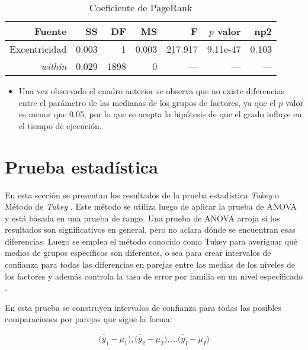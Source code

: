 \documentclass{article}
\begin{document}
\begin{table}[H]
\caption{{\small Coeficiente de PageRank}}
\begin{center}		
	\centering
		\begin{tabular}{rrrrrrr}		
			\hline
			\textbf{Fuente} & \textbf{SS} & \textbf{DF} & \textbf{MS}& \textbf{F}& \textbf{$p$ valor} & \textbf{np2}\\
			
			\hline
			 Excentricidad & 0.003  & 1 & 0.003  & 217.917 & 9.11e-47 & 0.103 \\
			 \textit{within}    & 0.029 & 1898 & 0  & --- & --- & --- \\			 			 
			\hline
		\end{tabular}
		\label{cual}
	\label{tab:una-tablita}
\end{center}	
\end{table}

\begin{itemize}
  \item Una vez observado el cuadro anterior se observa que no existe diferencias entre el parámetro de las medianas de los grupos de factores, ya que el $p$ valor es menor que 0.05, por lo que se acepta la hipótesis de que el grado influye en el tiempo de ejecución.    
\end{itemize}

\section{Prueba estadística}

En esta sección se presentan los resultados de la prueba estadística \textit{Tukey} o Método de \textit{Tukey} \cite{tukey}. Este método se utiliza luego de aplicar la prueba de ANOVA y está basada en una prueba de rango. Una prueba de ANOVA arroja si los resultados son significativos en general, pero no aclara dónde se encuentran esas diferencias. Luego se emplea el método conocido como Tukey para averiguar qué medios de grupos específicos son diferentes, o sea para crear intervalos de confianza para todas las diferencias en parejas entre las medias de los niveles de los factores y además controla la tasa de error por familia en un nivel especificado \cite{tukey}. %
 

En esta prueba se construyen intervalos de confianza para todas las posibles comparaciones por parejas que sigue la forma:  

\begin{equation}
 \bar{(y_{1}} - \mu_{1}), \bar{(y_{2}} - \mu_{2}),... \bar{(y_{I}} - \mu_{I}) 
\end{equation}
\end{document}
